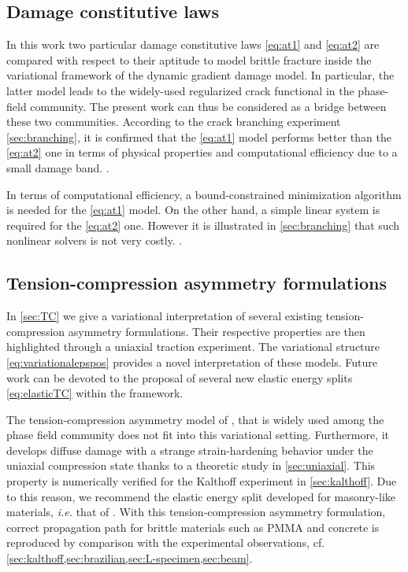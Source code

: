 \subsection{Damage constitutive laws}
In this work two particular damage constitutive laws \eqref{eq:at1} and \eqref{eq:at2} are compared with respect to their aptitude to model brittle fracture inside the variational framework of the dynamic gradient damage model. In particular, the latter model leads to the widely-used regularized crack functional in the phase-field community. The present work can thus be considered as a bridge between these two communities. According to the crack branching experiment \cref{sec:branching}, it is confirmed that the \eqref{eq:at1} model performs better than the \eqref{eq:at2} one in terms of physical properties and computational efficiency due to a small damage band. .

In terms of computational efficiency, a bound-constrained minimization algorithm is needed for the \eqref{eq:at1} model. On the other hand, a simple linear system is required for the \eqref{eq:at2} one. However it is illustrated in \cref{sec:branching} that such nonlinear solvers is not very costly. .

\subsection{Tension-compression asymmetry formulations}
In \cref{sec:TC} we give a variational interpretation of several existing tension-compression asymmetry formulations. Their respective properties are then highlighted through a uniaxial traction experiment. The variational structure \eqref{eq:variationalepspos} provides a novel interpretation of these models. Future work can be devoted to the proposal of several new elastic energy splits \eqref{eq:elasticTC} within the framework.

The tension-compression asymmetry model of \cite{MieheHofackerWelschinger:2010}, that is widely used among the phase field community does not fit into this variational setting. Furthermore, it develops diffuse damage with a strange strain-hardening behavior under the uniaxial compression state thanks to a theoretic study in \cref{sec:uniaxial}. This property is numerically verified for the Kalthoff experiment in \cref{sec:kalthoff}. Due to this reason, we recommend the elastic energy split developed for masonry-like materials, \emph{i.e.} that of \cite{FreddiRoyer-Carfagni:2010}. With this tension-compression asymmetry formulation, correct propagation path for brittle materials such as PMMA and concrete is reproduced by comparison with the experimental observations, cf. \cref{sec:kalthoff,sec:brazilian,sec:L-specimen,sec:beam}.

